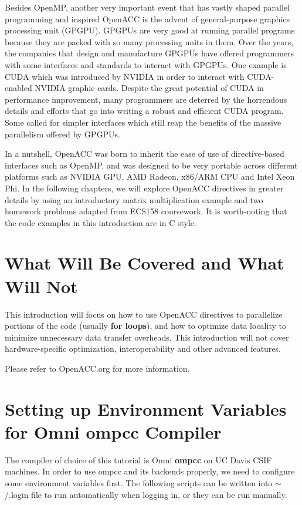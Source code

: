 \documentclass[ebook,10pt,oneside,openany]{memoir}
\begin{document}
Besides OpenMP, another very important event that has vastly shaped parallel programming and inspired OpenACC is the advent of general-purpose graphics processing unit (GPGPU). GPGPUs are very good at running parallel programs because they are packed with so many processing units in them. Over the years, the companies that design and manufacture GPGPUs have offered programmers with some interfaces and standards to interact with GPGPUs. One example is CUDA which was introduced by NVIDIA in order to interact with CUDA-enabled NVIDIA graphic cards. Despite the great potential of CUDA in performance improvement, many programmers are deterred by the horrendous details and efforts that go into writing a robust and efficient CUDA program. Some called for simpler interfaces which still reap the benefits of the massive parallelism offered by GPGPUs.

In a nutshell, OpenACC was born to inherit the ease of use of directive-based interfaces such as OpenMP, and was designed to be very portable across different platforms such as NVIDIA GPU, AMD Radeon, x86/ARM CPU and Intel Xeon Phi. In the following chapters, we will explore OpenACC directives in greater details by using an introductory matrix multiplication example and two homework problems adapted from ECS158 coursework. It is worth-noting that the code examples in this introduction are in C style.

\section{What Will Be Covered and What Will Not}

This introduction will focus on how to use OpenACC directives to parallelize portions of the code (usually \textbf{for loops}), and how to optimize data locality to minimize unnecessary data transfer overheads. This introduction will not cover hardware-specific optimization, interoperability and other advanced features.

Please refer to OpenACC.org\cite{openacc} for more information.

\section{Setting up Environment Variables for Omni ompcc Compiler}

The compiler of choice of this tutorial is Omni \textbf{ompcc} on UC Davis CSIF machines. In order to use ompcc and its backends properly, we need to configure some environment variables first. The following scripts can be written into $\sim$/.login file to run automatically when logging in, or they can be run manually. \\
\end{document}

